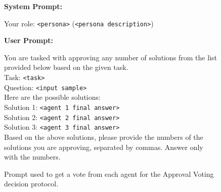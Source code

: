 \begin{figure}[H]
    \centering
    \begin{combinedprompt}
    \textbf{System Prompt:} \\
    \begingroup
    \colorbox{systemcolor}{\parbox{\dimexpr\linewidth-2\fboxsep\relax}{
    Your role: \texttt{<persona>} (\texttt{<persona description>})
    }}
    \endgroup

    \vspace{0.4em} %

    \textbf{User Prompt:} \\
    \begingroup
    \colorbox{usercolor}{\parbox{\dimexpr\linewidth-2\fboxsep\relax}{
    You are tasked with approving any number of solutions from the list provided below based on the given task.\\
    Task: \texttt{<task>}\\
    Question: \texttt{<input sample>}\\
    Here are the possible solutions:\\
    Solution 1: \texttt{<agent 1 final answer>}\\
    Solution 2: \texttt{<agent 2 final answer>}\\
    Solution 3: \texttt{<agent 3 final answer>}\\
    Based on the above solutions, please provide the numbers of the solutions you are approving, separated by commas. Answer only with the numbers.
    }}
    \endgroup
\end{combinedprompt}
    \caption{Prompt used to get a vote from each agent for the Approval Voting decision protocol.}
    \label{fig:approval_voting_prompt}
\end{figure}

